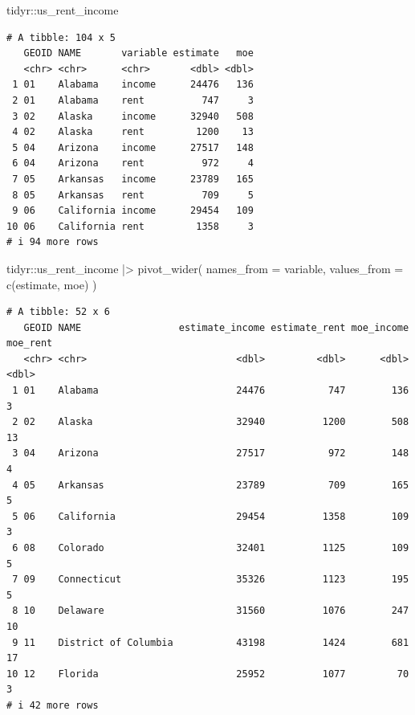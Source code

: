 \documentclass[
  letterpaper,
  DIV=11,
  numbers=noendperiod]{scrreprt}
\newenvironment{Shaded}{\begin{snugshade}}{\end{snugshade}}
\newcommand{\AttributeTok}[1]{\textcolor[rgb]{0.40,0.45,0.13}{#1}}
\newcommand{\FunctionTok}[1]{\textcolor[rgb]{0.28,0.35,0.67}{#1}}
\newcommand{\NormalTok}[1]{\textcolor[rgb]{0.00,0.23,0.31}{#1}}
\newcommand{\SpecialCharTok}[1]{\textcolor[rgb]{0.37,0.37,0.37}{#1}}
\begin{document}
\begin{Shaded}
\begin{Highlighting}[]
\NormalTok{tidyr}\SpecialCharTok{::}\NormalTok{us\_rent\_income}
\end{Highlighting}
\end{Shaded}

\begin{verbatim}
# A tibble: 104 x 5
   GEOID NAME       variable estimate   moe
   <chr> <chr>      <chr>       <dbl> <dbl>
 1 01    Alabama    income      24476   136
 2 01    Alabama    rent          747     3
 3 02    Alaska     income      32940   508
 4 02    Alaska     rent         1200    13
 5 04    Arizona    income      27517   148
 6 04    Arizona    rent          972     4
 7 05    Arkansas   income      23789   165
 8 05    Arkansas   rent          709     5
 9 06    California income      29454   109
10 06    California rent         1358     3
# i 94 more rows
\end{verbatim}

\begin{Shaded}
\begin{Highlighting}[]
\NormalTok{tidyr}\SpecialCharTok{::}\NormalTok{us\_rent\_income }\SpecialCharTok{|\textgreater{}}
    \FunctionTok{pivot\_wider}\NormalTok{(}
        \AttributeTok{names\_from =}\NormalTok{ variable, }
        \AttributeTok{values\_from =} \FunctionTok{c}\NormalTok{(estimate, moe)}
\NormalTok{    )}
\end{Highlighting}
\end{Shaded}

\begin{verbatim}
# A tibble: 52 x 6
   GEOID NAME                 estimate_income estimate_rent moe_income moe_rent
   <chr> <chr>                          <dbl>         <dbl>      <dbl>    <dbl>
 1 01    Alabama                        24476           747        136        3
 2 02    Alaska                         32940          1200        508       13
 3 04    Arizona                        27517           972        148        4
 4 05    Arkansas                       23789           709        165        5
 5 06    California                     29454          1358        109        3
 6 08    Colorado                       32401          1125        109        5
 7 09    Connecticut                    35326          1123        195        5
 8 10    Delaware                       31560          1076        247       10
 9 11    District of Columbia           43198          1424        681       17
10 12    Florida                        25952          1077         70        3
# i 42 more rows
\end{verbatim}
\end{document}
